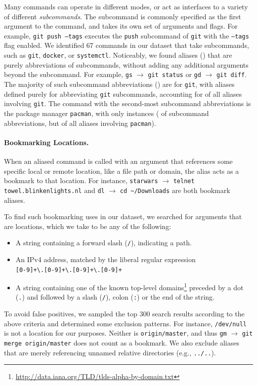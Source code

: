 \documentclass[smallextended,natbib]{svjour3}
\newcommand{\num}[1]{\numprint{#1}}
\newcommand{\per}[1]{\numprint[\%]{#1}}
\newcommand{\alias}[2]{{\texttt{#1} $\rightarrow$ \texttt{#2}}}
\newcommand{\cmd}[1]{{\texttt{#1}}}
\begin{document}
Many commands can operate in different modes, or act as interfaces to a variety of different \emph{subcommands}.
The subcommand is commonly specified as the first argument to the command, and takes its own set of arguments and flags.
For example, \texttt{git push --tags} executes the \texttt{push} subcommand of \cmd{git} with the \texttt{--tags} flag enabled.
We identified 67 commands in our dataset that take subcommands, such as \cmd{git}, \cmd{docker}, or \cmd{systemctl}.
Noticeably, we found \num{194850} aliases (\per{8.84}) that are purely abbreviations of subcommands, without adding any additional arguments beyond the subcommand.
For example, \alias{gs}{git status} or \alias{gd}{git diff}.
The majority of such subcommand abbreviations (\per{58.5}) are for \cmd{git}, with \num{113980} aliases defined purely for abbreviating \cmd{git} subcommands, accounting for \per{36.77} of all aliases involving \cmd{git}.
The command with the second-most subcommand abbreviations is the package manager \cmd{pacman}, with only \num{9918} instances (\per{5.09} of subcommand abbreviations, but \per{68.67} of all aliases involving \cmd{pacman}).

\paragraph{Bookmarking Locations.}

When an aliased command is called with an argument that references some specific local or remote location, like a file path or domain, the alias acts as a bookmark to that location.
For instance, \alias{starwars}{telnet towel.blinkenlights.nl} and \alias{dl}{cd \textasciitilde/Downloads} are both bookmark aliases.

To find such bookmarking uses in our dataset, we searched for arguments that are locations, which we take to be any of the following:
\begin{itemize}
    \item A string containing a forward slash (\verb|/|), indicating a path.
    \item An IPv4 address, matched by the liberal regular expression\\\verb|[0-9]+\.[0-9]+\.[0-9]+\.[0-9]+|
    \item A string containing one of the known top-level domains\footnote{\url{http://data.iana.org/TLD/tlds-alpha-by-domain.txt}} preceded by a dot (\verb|.|) and followed by a slash (\verb|/|), colon (\verb|:|) or the end of the string.
\end{itemize}
To avoid false positives, we sampled the top 300 search results according to the above criteria and determined some exclusion patterns.
For instance, \texttt{/dev/null} is not a location for our purposes.
Neither is \texttt{origin/master}, and thus \alias{gm}{git merge origin/master} does not count as a bookmark.
We also exclude aliases that are merely referencing unnamed relative directories (e.g., \verb|../..|).
\end{document}
